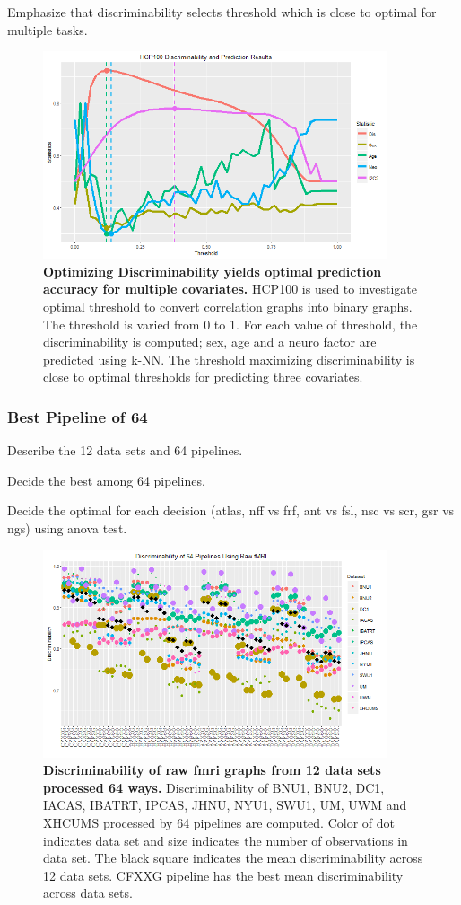\documentclass{article}
\begin{document}
 Emphasize that discriminability selects threshold which is close to optimal for multiple tasks.

\begin{figure}[ht!]
\includegraphics[width=4.0in]{../Figs/HCP_100.png}
\caption{{\bf Optimizing Discriminability yields optimal prediction accuracy for multiple covariates.} HCP100 is used to investigate optimal threshold to convert correlation graphs into binary graphs. The threshold is varied from 0 to 1. For each value of threshold, the discriminability is computed;  sex, age and a neuro factor are predicted using k-NN. The threshold maximizing discriminability is close to optimal thresholds for predicting three covariates. }
\label{fig:4}
\end{figure}

\subsubsection{Best Pipeline of 64}
 Describe the 12 data sets and 64 pipelines. 

 Decide the best among 64 pipelines.

 Decide the optimal for each decision (atlas, nff vs frf, ant vs fsl, nsc vs scr, gsr vs ngs) using anova test.
\begin{figure}[ht!]
	\includegraphics[width=4.0in]{../Figs/64_pipelines_raw.png}
	\caption{{\bf Discriminability of raw fmri graphs from 12 data sets processed 64 ways.}  Discriminability of BNU1, BNU2, DC1, IACAS, IBATRT, IPCAS, JHNU, NYU1, SWU1, UM, UWM and XHCUMS processed by 64 pipelines are computed. Color of dot indicates data set and size indicates the number of observations in data set. The black square indicates the mean discriminability across 12 data sets. CFXXG pipeline has the best mean discriminability across data sets. }
	\label{fig:6}
\end{figure}
\end{document}

